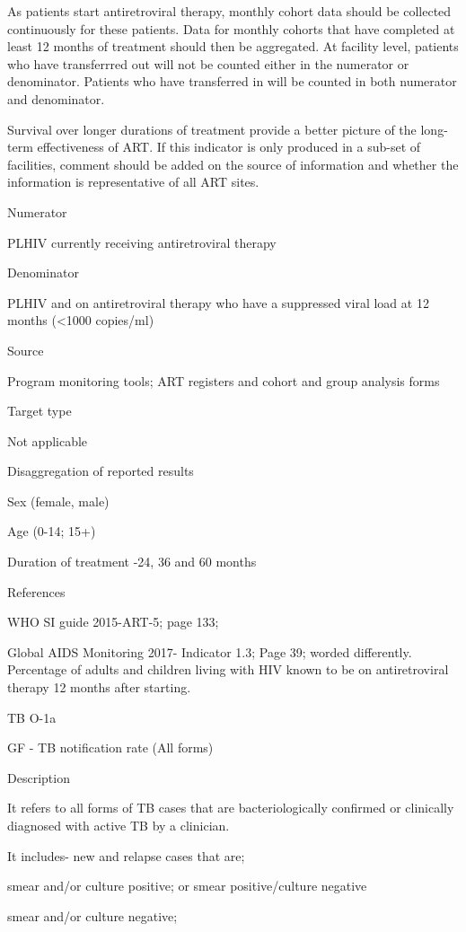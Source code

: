 \documentclass[]{book}
\begin{document}
As patients start antiretroviral therapy, monthly cohort data should be collected continuously for these patients. Data for monthly cohorts that have completed at least 12 months of treatment should then be aggregated. At facility level, patients who have transferrred out will not be counted either in the numerator or denominator. Patients who have transferred in will be counted in both numerator and denominator.

Survival over longer durations of treatment provide a better picture of the long-term effectiveness of ART. If this indicator is only produced in a sub-set of facilities, comment should be added on the source of information and whether the information is representative of all ART sites.

Numerator

PLHIV currently receiving antiretroviral therapy

Denominator

PLHIV and on antiretroviral therapy who have a suppressed viral load at 12 months (\textless{}1000 copies/ml)

Source

Program monitoring tools; ART registers and cohort and group analysis forms

Target type

Not applicable

Disaggregation of reported results

Sex (female, male)

Age (0-14; 15+)

Duration of treatment -24, 36 and 60 months

References

WHO SI guide 2015-ART-5; page 133;

Global AIDS Monitoring 2017- Indicator 1.3; Page 39; worded differently.
Percentage of adults and children living with HIV known to be on antiretroviral therapy 12 months after starting.

TB O-1a

GF - TB notification rate (All forms)

Description

It refers to all forms of TB cases that are bacteriologically confirmed or clinically diagnosed with active TB by a clinician.

It includes- new and relapse cases that are;

smear and/or culture positive; or smear positive/culture negative

smear and/or culture negative;
\end{document}
